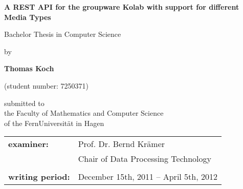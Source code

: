 \begin{titlepage}

\vspace*{0.2cm}
\begin{center}
\Huge{\textbf{A REST API for the groupware Kolab with support for different Media Types}}
\vspace{1cm}

\large{Bachelor Thesis in Computer Science}

\vspace{1cm}

\normalsize{by}

\Large{\textbf{Thomas Koch}}

\normalsize{(student number: 7250371)}

\vspace{1.5cm}
\large{submitted to \\
the Faculty of Mathematics and Computer Science \\
of the FernUniversität in Hagen}

\vspace{3.5cm}

\end{center}

\begin{tabular}{ll}
\textbf{examiner:}    & Prof. Dr. Bernd Krämer\\
& Chair of Data Processing Technology \\
& \\
\textbf{writing period:} & December 15th, 2011 -- April 5th, 2012 \\
\end{tabular}

\end{titlepage}